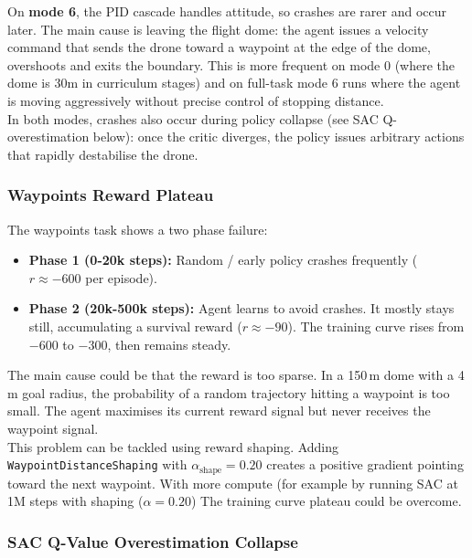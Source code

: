 \documentclass[11pt,a4paper]{article}
\begin{document}
On \textbf{mode 6}, the PID cascade handles attitude, so crashes are rarer and occur later. The main cause is leaving the flight dome: the agent issues a velocity command that sends the drone toward a waypoint at the edge of the dome, overshoots and exits the boundary. This is more frequent on mode 0 (where the dome is 30m in curriculum stages) and on full-task mode 6 runs where the agent is moving aggressively without precise control of stopping distance. \\

In both modes, crashes also occur during policy collapse (see SAC Q-overestimation below): once the critic diverges, the policy issues arbitrary actions that rapidly destabilise the drone.

\subsubsection{Waypoints Reward Plateau}

The waypoints task shows a two phase failure:

\begin{itemize}
  \item \textbf{Phase 1 (0-20k steps):} Random / early policy crashes frequently
    ($r \approx -600$ per episode).
  \item \textbf{Phase 2 (20k-500k steps):} Agent learns to avoid crashes. It mostly stays still, accumulating a survival reward ($r \approx -90$).  The training curve  rises from $-600$ to $-300$, then remains steady.
\end{itemize}

The main cause could be that the reward is too sparse. In a 150\,m dome with a 4\,m goal radius, the probability of a random trajectory hitting a waypoint is too small. The agent maximises its current reward signal but never receives the waypoint signal. \\

This problem can be tackled using reward shaping.  Adding \texttt{WaypointDistanceShaping} with
$\alpha_\text{shape}=0.20$ creates a positive gradient pointing toward the next waypoint. With more compute (for example by running SAC at 1M steps with shaping ($\alpha=0.20$) The training curve plateau could be overcome.

\subsubsection{SAC Q-Value Overestimation Collapse}
\end{document}
